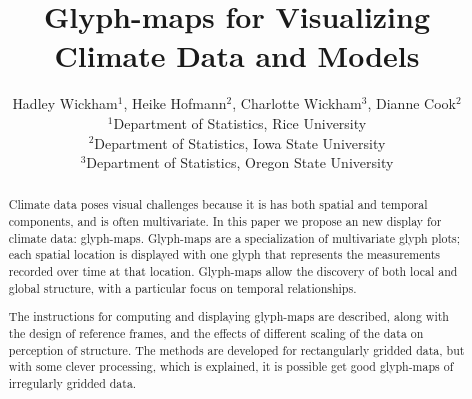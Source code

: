 \documentclass[oneside]{article}
\begin{document}
\title{Glyph-maps for Visualizing Climate Data and Models}
\author{Hadley Wickham$^1$, Heike Hofmann$^2$, Charlotte Wickham$^3$, Dianne Cook$^2$\\
$^1$Department of Statistics, Rice University\\
$^2$Department of Statistics, Iowa State University\\
$^3$Department of Statistics, Oregon State University}
\date{}




%
%
\maketitle

\begin{abstract}

Climate data poses visual challenges because it is has both spatial and temporal components, and is often multivariate. In this paper we propose an new display for climate data: glyph-maps. Glyph-maps are a specialization of multivariate glyph plots; each spatial location is displayed with one glyph that represents the measurements recorded over time at that location. Glyph-maps allow the discovery of both local and global structure, with a particular focus on temporal relationships.

The instructions for computing and displaying glyph-maps are described, along with the design of reference frames, and the effects of different scaling of the data on perception of structure. The methods are developed for rectangularly gridded data, but with some clever processing, which is explained, it is possible get good glyph-maps of irregularly gridded data.

\end{abstract}
\end{document}
